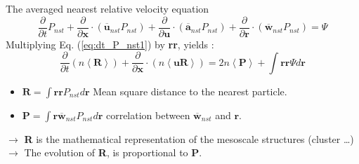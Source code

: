 \documentclass{sintefbeamer}
\newcommand{\pavg}[1]{n \left<#1\right>}
\newcommand{\nstavg}[1]{\overline{#1}_{nst}}
\newcommand{\pddt}{\frac{\partial}{\partial t}}
\begin{document}
\begin{frame}{The averaged nearest relative velocity equation}
  \begin{equation}
      \pddt P_{nst}
      + \frac{\partial}{\partial\textbf{x}} \cdot
      \left(
        \nstavg{\textbf{u}}
        P_{nst}
      \right)
      + \frac{\partial}{\partial\textbf{u}} \cdot
      \left(
        \nstavg{\textbf{a}}
        P_{nst}
      \right)
    + 
    \frac{\partial}{\partial \textbf{r}} \cdot
    \left(
        \nstavg{\textbf{w}}
        P_{nst}
    \right)
    = \Psi
    \label{eq:dt_P_nst1}
\end{equation}
Multiplying Eq. (\ref{eq:dt_P_nst1}) by \textbf{rr}, yields :
\begin{equation}
  \pddt (\pavg{\textbf{R}})
  + \frac{\partial}{\partial\textbf{x}} \cdot
  (\pavg{\textbf{uR}})
  = 2\pavg{\textbf{P}}
  + \int \textbf{rr} \Psi d\textbf{r}
\end{equation}

\begin{itemize}
  \item $\textbf{R} = \int \textbf{rr} P_{nst} d\textbf{r}$ Mean square distance to the nearest particle. 
  \item $\textbf{P} = \int \textbf{r} \nstavg{\textbf{w}} P_{nst} d\textbf{r}$ correlation between $\nstavg{\textbf{w}}$ and $\textbf{r}$. 
\end{itemize}

$\rightarrow $ \textbf{R} is the mathematical representation of the mesoscale structures (cluster \ldots)
$\rightarrow $ The evolution of \textbf{R}, is proportional to \textbf{P}.
\end{frame}
\end{document}

